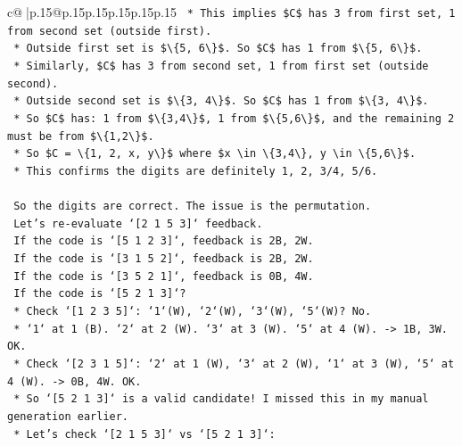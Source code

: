 \documentclass{article}
\begin{document}
{\begin{supertabular}{c@{$\;$}|p{.15\linewidth}@{}p{.15\linewidth}p{.15\linewidth}p{.15\linewidth}p{.15\linewidth}p{.15\linewidth}}
{{{\texttt{        *   This implies \$C\$ has 3 from first set, 1 from second set (outside first).} \\
\texttt{        *   Outside first set is \$\textbackslash{}\{5, 6\textbackslash{}\}\$. So \$C\$ has 1 from \$\textbackslash{}\{5, 6\textbackslash{}\}\$.} \\
\texttt{        *   Similarly, \$C\$ has 3 from second set, 1 from first set (outside second).} \\
\texttt{        *   Outside second set is \$\textbackslash{}\{3, 4\textbackslash{}\}\$. So \$C\$ has 1 from \$\textbackslash{}\{3, 4\textbackslash{}\}\$.} \\
\texttt{        *   So \$C\$ has: 1 from \$\textbackslash{}\{3,4\textbackslash{}\}\$, 1 from \$\textbackslash{}\{5,6\textbackslash{}\}\$, and the remaining 2 must be from \$\textbackslash{}\{1,2\textbackslash{}\}\$.} \\
\texttt{        *   So \$C = \textbackslash{}\{1, 2, x, y\textbackslash{}\}\$ where \$x \textbackslash{}in \textbackslash{}\{3,4\textbackslash{}\}, y \textbackslash{}in \textbackslash{}\{5,6\textbackslash{}\}\$.} \\
\texttt{        *   This confirms the digits are definitely 1, 2, 3/4, 5/6.} \\
\\ 
\texttt{    So the digits are correct. The issue is the permutation.} \\
\texttt{    Let's re{-}evaluate `{[}2 1 5 3{]}` feedback.} \\
\texttt{    If the code is `{[}5 1 2 3{]}`, feedback is 2B, 2W.} \\
\texttt{    If the code is `{[}3 1 5 2{]}`, feedback is 2B, 2W.} \\
\texttt{    If the code is `{[}3 5 2 1{]}`, feedback is 0B, 4W.} \\
\texttt{    If the code is `{[}5 2 1 3{]}`?} \\
\texttt{        *   Check `{[}1 2 3 5{]}`: `1`(W), `2`(W), `3`(W), `5`(W)? No.} \\
\texttt{        *   `1` at 1 (B). `2` at 2 (W). `3` at 3 (W). `5` at 4 (W). {-}> 1B, 3W. OK.} \\
\texttt{        *   Check `{[}2 3 1 5{]}`: `2` at 1 (W), `3` at 2 (W), `1` at 3 (W), `5` at 4 (W). {-}> 0B, 4W. OK.} \\
\texttt{        *   So `{[}5 2 1 3{]}` is a valid candidate! I missed this in my manual generation earlier.} \\
\texttt{        *   Let's check `{[}2 1 5 3{]}` vs `{[}5 2 1 3{]}`:} \\
}}}
\end{supertabular}}
\end{document}
